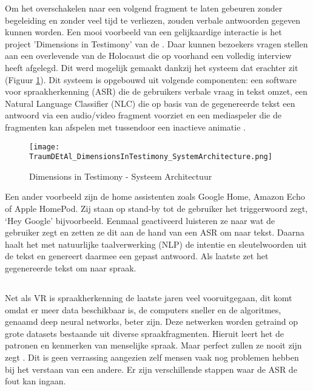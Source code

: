 Om het overschakelen naar een volgend fragment te laten gebeuren zonder begeleiding en zonder veel tijd te verliezen, zouden verbale antwoorden gegeven kunnen worden. Een mooi voorbeeld van een gelijkaardige interactie is het project 'Dimensions in Testimony' van de \textcite{USCShoahFoundation2020}. Daar kunnen bezoekers vragen stellen aan een overlevende van de Holocaust die op voorhand een volledig interview heeft afgelegd. Dit werd mogelijk gemaakt dankzij het systeem dat erachter zit (Figuur \ref{fig:DiTArchitecture}). Dit systeem is opgebouwd uit volgende componenten: een software voor spraakherkenning (ASR) die de gebruikers verbale vraag in tekst omzet, een Natural Language Classifier (NLC) die op basis van de gegenereerde tekst een antwoord via een audio/video fragment voorziet en een mediaspeler die de fragmenten kan afspelen met tussendoor een inactieve animatie \autocite{Traum2015}.

\begin{figure}[h]
    \centering
    \texttt{[image: TraumDEtAl\_DimensionsInTestimony\_SystemArchitecture.png]}
    \caption{Dimensions in Testimony - Systeem Architectuur \autocite{Traum2015}}
    \label{fig:DiTArchitecture}
\end{figure}

Een ander voorbeeld zijn de home assistenten zoals Google Home, Amazon Echo of Apple HomePod. Zij staan op stand-by tot de gebruiker het triggerwoord zegt, `Hey Google' bijvoorbeeld. Eenmaal geactiveerd luisteren ze naar wat de gebruiker zegt en zetten ze dit aan de hand van een ASR om naar tekst. Daarna haalt het met natuurlijke taalverwerking (NLP) de intentie en sleutelwoorden uit de tekst en genereert daarmee een gepast antwoord. Als laatste zet het gegenereerde tekst om naar spraak.

\subsection{}%

Net als VR is spraakherkenning de laatste jaren veel vooruitgegaan, dit komt omdat er meer data beschikbaar is, de computers sneller en de algoritmes, genaamd deep neural networks, beter zijn. Deze netwerken worden getraind op grote datasets bestaande uit diverse spraakfragmenten. Hieruit leert het de patronen en kenmerken van menselijke spraak. Maar perfect zullen ze nooit zijn zegt \textcite{Hessen2020}. Dit is geen verrassing aangezien zelf mensen vaak nog problemen hebben bij het verstaan van een andere. Er zijn verschillende stappen waar de ASR de fout kan ingaan.

